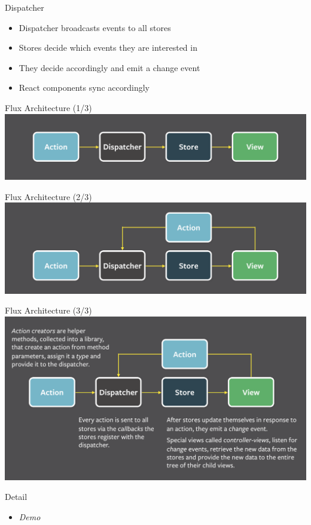 \documentclass[presentation]{beamer}
\begin{document}
\begin{frame}[label={sec:orgheadline5}]{Dispatcher}
\begin{itemize}
\item Dispatcher broadcasts events to all stores
\item Stores decide which events they are interested in
\item They decide accordingly and emit a change event
\item React components sync accordingly
\end{itemize}
\end{frame}

\begin{frame}[label={sec:orgheadline6}]{Flux Architecture (1/3)}
\includegraphics[width=.9\linewidth]{./flux1.png}
\end{frame}



\begin{frame}[label={sec:orgheadline7}]{Flux Architecture (2/3)}
\includegraphics[width=.9\linewidth]{./flux2.png}
\end{frame}
\begin{frame}[label={sec:orgheadline8}]{Flux Architecture (3/3)}
\includegraphics[width=.9\linewidth]{./flux3.png}
\end{frame}
\begin{frame}[label={sec:orgheadline9}]{Detail}
\begin{itemize}
\item \emph{Demo}
\end{itemize}
\end{frame}
\end{document}
